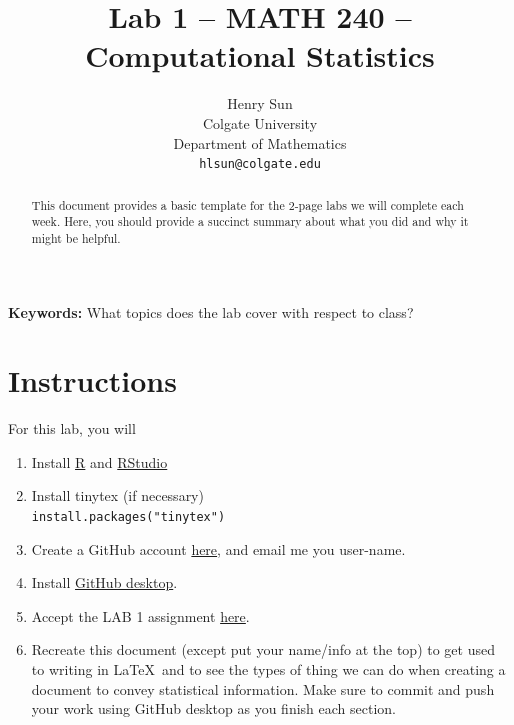 \documentclass{article}\usepackage[]{graphicx}\usepackage[]{xcolor}
\begin{document}
\vspace{-1in}
\title{Lab 1 -- MATH 240 -- Computational Statistics}

\author{
  Henry Sun \\
  Colgate University  \\
  Department of Mathematics\\
  {\tt hlsun@colgate.edu}
}

\date{}

\maketitle

\begin{multicols}{2}
\begin{abstract}
 This document provides a basic template for the 2-page labs we will complete each week. Here, you should provide a succinct summary about what you did and why it might be helpful.
\end{abstract}

\indent \textbf{Keywords:} What topics does the lab cover with respect to class? 

\section{Instructions}
For this lab, you will 
\begin{enumerate}[1.]\itemsep0em
\item Install  \href{https://cran.rstudio.com/}{R} and \href{https://posit.co/download/rstudio-desktop/}{RStudio}
\item Install tinytex (if necessary)
\\ {\tt install.packages("tinytex")}
\item Create a GitHub account \href{https://github.com/}{here}, and email me you user-name.
\item Install \href{https://github.com/apps/desktop}{GitHub desktop}.
\item Accept the LAB 1 assignment \href{https://classroom.github.com/assignment-invitations/49ec7c38806e92bfef8bf3094b9b11d3}{here}.
\item Recreate this document (except put your name/info at the top) to get used to writing in \LaTeX~and to see the types of thing we can do when creating a document to convey statistical information. Make sure to commit and push your work using GitHub desktop as you finish each section. 
\end{enumerate}


\end{multicols}
\end{document}
